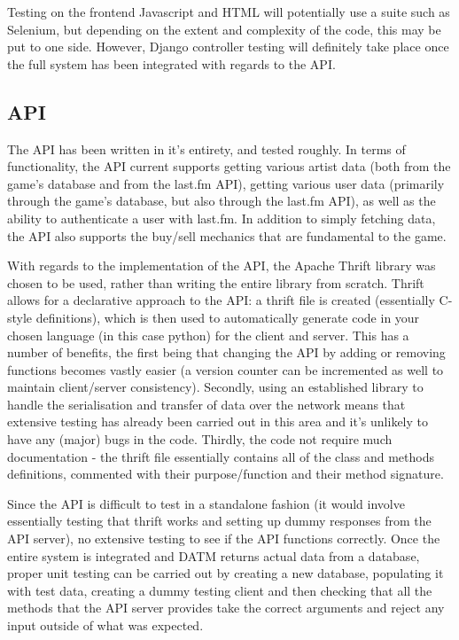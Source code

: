 \documentclass[a4paper,10pt,twoside]{article}
\begin{document}
Testing on the frontend Javascript and HTML will potentially use a suite such as Selenium, but depending on the extent and complexity of the code, this may be put to one side. However, Django controller testing will definitely take place once the full system has been integrated with regards to the API.

\subsection{API}

The API has been written in it's entirety, and tested roughly. In terms of functionality, the API current supports getting various artist data (both from the game's database and from the last.fm API), getting various user data (primarily through the game's database, but also through the last.fm API), as well as the ability to authenticate a user with last.fm. In addition to simply fetching data, the API also supports the buy/sell mechanics that are fundamental to the game.

With regards to the implementation of the API, the Apache Thrift library was chosen to be used, rather than writing the entire library from scratch. Thrift allows for a declarative approach to the API: a thrift file is created (essentially C-style definitions), which is then used to automatically generate code in your chosen language (in this case python) for the client and server. This has a number of benefits, the first being that changing the API by adding or removing functions becomes vastly easier (a version counter can be incremented as well to maintain client/server consistency). Secondly, using an established library to handle the serialisation and transfer of data over the network means that extensive testing has already been carried out in this area and it's unlikely to have any (major) bugs in the code. Thirdly, the code not require much documentation - the thrift file essentially contains all of the class and methods definitions, commented with their purpose/function and their method signature.

Since the API is difficult to test in a standalone fashion (it would involve essentially testing that thrift works and setting up dummy responses from the API server), no extensive testing to see if the API functions correctly. Once the entire system is integrated and DATM returns actual data from a database, proper unit testing can be carried out by creating a new database, populating it with test data, creating a dummy testing client and then checking that all the methods that the API server provides take the correct arguments and reject any input outside of what was expected.
\end{document}
